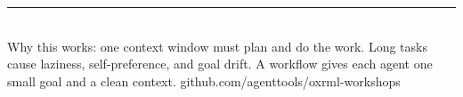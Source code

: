 \documentclass[10pt]{article}
\begin{document}
\vspace{2pt}
{\color{grayline}\rule{\linewidth}{0.8pt}}\\[0pt]
{\footnotesize\color{graymid} Why this works: one context window must plan and do the work. Long tasks cause laziness, self-preference, and goal drift. A workflow gives each agent one small goal and a clean context. \hfill {\ttfamily github.com/agenttools/oxrml-workshops}}
\end{document}
